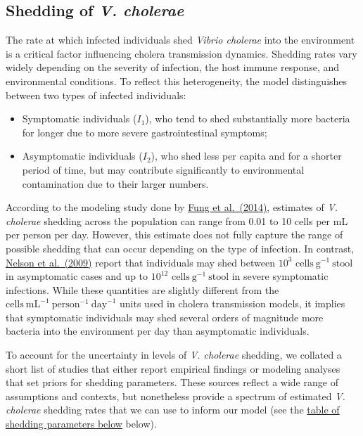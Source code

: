 \documentclass[
]{book}
\providecommand{\tightlist}{%
  \setlength{\itemsep}{0pt}\setlength{\parskip}{0pt}}
\begin{document}
\subsection{\texorpdfstring{Shedding of \emph{V. cholerae}}{Shedding of V. cholerae}}\label{shedding-of-v.-cholerae}

The rate at which infected individuals shed \emph{Vibrio cholerae} into the environment is a critical factor influencing cholera transmission dynamics. Shedding rates vary widely depending on the severity of infection, the host immune response, and environmental conditions. To reflect this heterogeneity, the model distinguishes between two types of infected individuals:

\begin{itemize}
\tightlist
\item
  Symptomatic individuals (\(I_1\)), who tend to shed substantially more bacteria for longer due to more severe gastrointestinal symptoms;
\item
  Asymptomatic individuals (\(I_2\)), who shed less per capita and for a shorter period of time, but may contribute significantly to environmental contamination due to their larger numbers.
\end{itemize}

According to the modeling study done by \href{https://www.ncbi.nlm.nih.gov/pmc/articles/PMC3926264/}{Fung et al.~(2014)}, estimates of \emph{V. cholerae} shedding across the population can range from 0.01 to 10 cells per mL per person per day. However, this estimate does not fully capture the range of possible shedding that can occur depending on the type of infection. In contrast, \href{https://www.ncbi.nlm.nih.gov/pmc/articles/PMC3842031/}{Nelson et al.~(2009)} report that individuals may shed between \(10^3\) \(\text{cells}~\text{g}^{-1}~\text{stool}\) in asymptomatic cases and up to \(10^{12}\) \(\text{cells}~\text{g}^{-1}~\text{stool}\) in severe symptomatic infections. While these quantities are slightly different from the \(\text{cells}~\text{mL}^{-1}~\text{person}^{-1}~\text{day}^{-1}\) units used in cholera transmission models, it implies that symptomatic individuals may shed several orders of magnitude more bacteria into the environment per day than asymptomatic individuals.

To account for the uncertainty in levels of \emph{V. cholerae} shedding, we collated a short list of studies that either report empirical findings or modeling analyses that set priors for shedding parameters. These sources reflect a wide range of assumptions and contexts, but nonetheless provide a spectrum of estimated \emph{V. cholerae} shedding rates that we can use to inform our model (see the \hyperref[shedding-table]{table of shedding parameters below} below).
\end{document}
